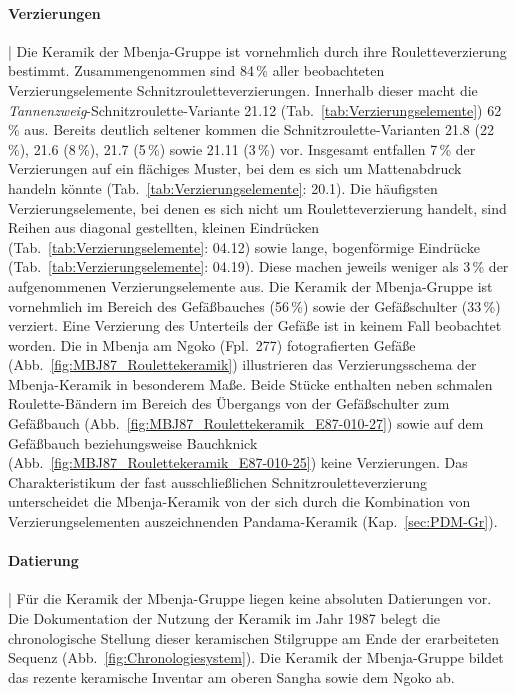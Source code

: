 \paragraph{Verzierungen}\hspace{-.5em}|\hspace{.5em}%
Die Keramik der Mbenja-Gruppe ist vornehmlich durch ihre Rouletteverzierung bestimmt. Zusammengenommen sind 84\,\% aller beobachteten Verzierungselemente Schnitzrouletteverzierungen. Innerhalb dieser macht die \textit{Tannenzweig}-Schnitzroulette-Variante 21.12 (Tab.~\ref{tab:Verzierungselemente}) 62\,\% aus. Bereits deutlich seltener kommen die Schnitzroulette-Varianten 21.8 (22\,\%), 21.6 (8\,\%), 21.7 (5\,\%) sowie 21.11 (3\,\%) vor. Insgesamt entfallen 7\,\% der Verzierungen auf ein flächiges Muster, bei dem es sich um Mattenabdruck handeln könnte (Tab.~\ref{tab:Verzierungselemente}: 20.1). Die häufigsten Verzierungselemente, bei denen es sich nicht um Rouletteverzierung handelt, sind Reihen aus diagonal gestellten, kleinen Eindrücken (Tab.~\ref{tab:Verzierungselemente}: 04.12) sowie lange, bogenförmige Eindrücke (Tab.~\ref{tab:Verzierungselemente}: 04.19). Diese machen jeweils weniger als 3\,\% der aufgenommenen Verzierungselemente aus. Die Keramik der Mbenja-Gruppe ist vornehmlich im Bereich des Gefäßbauches (56\,\%) sowie der Gefäßschulter (33\,\%) verziert. Eine Verzierung des Unterteils der Gefäße ist in keinem Fall beobachtet worden. Die in Mbenja am \mbox{Ngoko} (Fpl.~277) fotografierten Gefäße (Abb.~\ref{fig:MBJ87_Roulettekeramik}) illustrieren das Verzierungsschema der Mbenja-Keramik in besonderem Maße. Beide Stücke enthalten neben schmalen Roulette-Bändern im Bereich des Übergangs von der Gefäßschulter zum Gefäßbauch (Abb.~\ref{fig:MBJ87_Roulettekeramik_E87-010-27}) sowie auf dem Gefäßbauch beziehungsweise Bauchknick (Abb.~\ref{fig:MBJ87_Roulettekeramik_E87-010-25}) keine Verzierungen. Das Charakteristikum der fast ausschließlichen Schnitzrouletteverzierung unterscheidet die Mbenja-Keramik von der sich durch die Kombination von Verzierungselementen auszeichnenden Pandama-Keramik (Kap.~\ref{sec:PDM-Gr}). 


\paragraph{Datierung}\hspace{-.5em}|\hspace{.5em}%
Für die Keramik der Mbenja-Gruppe liegen keine absoluten Datierungen vor. Die Dokumentation der Nutzung der Keramik im Jahr 1987 belegt die chronologische Stellung dieser keramischen Stilgruppe am Ende der erarbeiteten Sequenz (Abb.~\ref{fig:Chronologiesystem}). Die Keramik der Mbenja-Gruppe bildet das rezente keramische Inventar am oberen \mbox{Sangha} sowie dem \mbox{Ngoko} ab.


